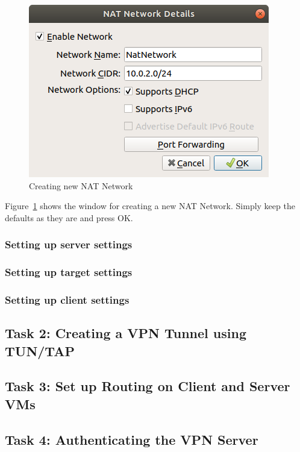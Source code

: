 \documentclass[12pt]{article}
\begin{document}
\begin{figure}[H]
    \begin{center}
        \includegraphics[scale=0.5]{NATNetwork_2.png}
    \end{center}{}
    \caption{Creating new NAT Network}
    \label{fig:t1_3}
\end{figure}

Figure~\ref{fig:t1_3} shows the window for creating a new NAT Network. Simply keep the defaults as they are and press OK.

\subsubsection{Setting up server settings}

\subsubsection{Setting up target settings}
\subsubsection{Setting up client settings}


\subsection{Task 2: Creating a VPN Tunnel using TUN/TAP}


\subsection{Task 3: Set up Routing on Client and Server VMs}
\subsection{Task 4: Authenticating the VPN Server}
\end{document}
